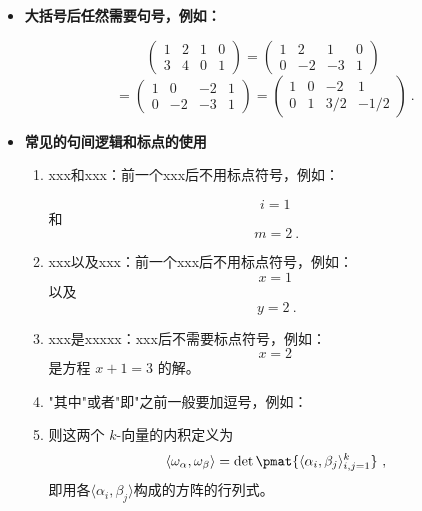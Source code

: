 \begin{itemize}
\item \textbf{大括号后任然需要句号，例如：}

$$
\left(
    \begin{matrix}
    1&2&1&0\\
    3&4&0&1
    \end{matrix}\right)=\left(
    \begin{matrix}
    1&2&1&0\\
    0&-2&-3&1
    \end{matrix}\right)~$$
    $$
    =\left(
    \begin{matrix}
    1&0&-2&1\\
    0&-2&-3&1
    \end{matrix}\right)=\left(
    \begin{matrix}
    1&0&-2&1\\
    0&1&3/2&-1/2
    \end{matrix}
\right)~.
$$

\item \textbf{常见的句间逻辑和标点的使用}

\begin{enumerate}
\item xxx和xxx：前一个xxx后不用标点符号，例如：

\begin{equation}
i=1~
\end{equation}
和
\begin{equation}
m=2~.
\end{equation}
\item xxx以及xxx：前一个xxx后不用标点符号，例如：
\begin{equation}
x=1~
\end{equation}
以及
\begin{equation}
y=2~.
\end{equation}

 \item xxx是xxxxx：xxx后不需要标点符号，例如：
\begin{equation}
x=2~
\end{equation}
是方程 $x+1=3$ 的解。
\item "其中"或者"即"之前一般要加逗号，例如：

\item 则这两个 $k$-向量的内积定义为
\begin{equation}
\langle\omega_\alpha, \omega_\beta\rangle = \det \pmat{\langle \alpha_i, \beta_j \rangle_{i, j=1}^k}~,
\end{equation}
即用各$\langle \alpha_i, \beta_j \rangle$构成的方阵的行列式。


\end{enumerate}
\end{itemize}
